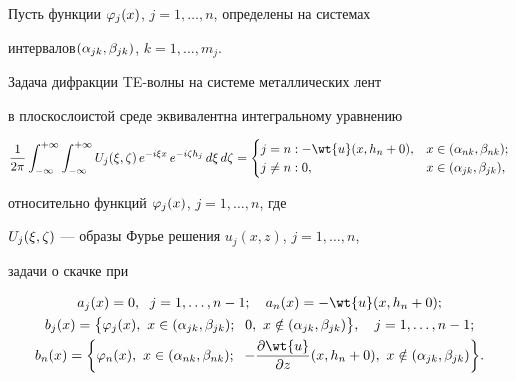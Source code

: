\begin{thm}


Пусть функции $\varphi_j(x)$, $j=1,\dotsc,n$, определены на системах


интервалов\linebreak $(\alpha_{jk}, \beta_{jk})$, $k=1,\dotsc,m_j$.


Задача дифракции TE-волны на системе металлических лент


в плоскослоистой среде эквивалентна интегральному уравнению


\begin{equation}


\frac{1}{2\pi}\int_{-\infty}^{+\infty}\int_{-\infty}^{+\infty}


U_j(\xi,\dz)\,e^{-i\xi x}\,e^{-i\dz h_j}\,d\xi\,d\dz =


\begin{cases}


j=n:-\wt{u}(x,h_n+0), & x\in (\al_{nk}, \be_{nk}) ;\\


j\ne n:0, & x\in (\al_{jk}, \be_{jk}),


\end{cases}


\end{equation}


относительно функций $\varphi_j(x)$, $j=1,\dotsc,n$, где


$U_j(\xi,\zeta)$ --- образы Фурье решения $u_j(x,z)$, $j=1,\dotsc,n$,


задачи о скачке при


\begin{gather}


a_j(x) = 0,\ \; j=1,\dotsc,n-1 ;\quad


a_n(x) = -\wt{u}(x,h_n+0) ;\notag \\


%


b_j(x) = \bigl\{ \fy_j(x),\ x\in (\al_{jk}, \be_{jk});\ \;


0,\ x\notin (\al_{jk}, \be_{jk})


\bigr\},\quad j=1,\dotsc,n-1; \\


%


b_n(x) = \bigg\{ \fy_n(x),\ x\in (\al_{nk}, \be_{nk});\ \;


-\frac{\pa\wt{u}}{\pa z}(x,h_n+0), 


\ x\notin (\al_{jk}, \be_{jk})\bigg\} . \notag


\end{gather}


\end{thm}





